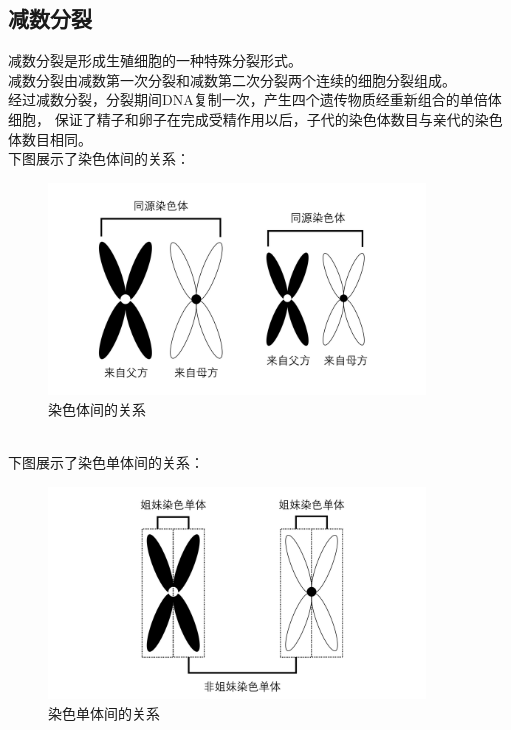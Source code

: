 \documentclass[UTF8]{ctexart}
\begin{document}
\subsection{减数分裂}
    减数分裂是形成生殖细胞的一种特殊分裂形式。\\[3mm]
    减数分裂由减数第一次分裂和减数第二次分裂两个连续的细胞分裂组成。\\[3mm]
    经过减数分裂，分裂期间DNA复制一次，产生四个遗传物质经重新组合的单倍体细胞，
    保证了精子和卵子在完成受精作用以后，子代的染色体数目与亲代的染色体数目相同。\\[6mm]
    下图展示了染色体间的关系：
    \begin{figure}[h]
        \begin{center}
            \includegraphics[width=10cm]{BiologyImage/44.jpg}
            \caption{染色体间的关系}
        \end{center}
    \end{figure}\\
    下图展示了染色单体间的关系：
    \begin{figure}[h]
        \begin{center}
            \includegraphics[width=10cm]{BiologyImage/45.jpg}
            \caption{染色单体间的关系}
        \end{center}
    \end{figure}\\

\newpage
\end{document}
